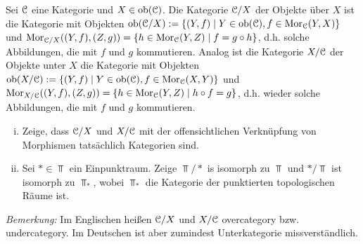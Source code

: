 \begin{aufgabe}
	Sei $\mathcal C$ eine Kategorie und $X\in\textrm{ob}(\mathcal C)$. Die Kategorie $\mathcal C/X$ der Objekte über $X$ ist die Kategorie mit Objekten $\textrm{ob}(\mathcal C/X):=\{(Y,f)\mid Y\in\textrm{ob}(\mathcal C),f\in\operatorname{Mor}_\mathcal C(Y,X)\}$ und $\operatorname{Mor}_{\mathcal C/X}((Y,f),(Z,g))=\{h\in\operatorname{Mor}_\mathcal C(Y,Z)\mid f=g\circ h\}$, d.h. solche Abbildungen, die mit $f$ und $g$ kommutieren.  Analog ist die Kategorie $X/\mathcal C$ der Objekte unter $X$ die Kategorie mit Objekten $\textrm{ob}(X/\mathcal C):=\{(Y,f)\mid Y\in\textrm{ob}(\mathcal C),f\in\operatorname{Mor}_\mathcal C(X,Y)\}$ und $\operatorname{Mor}_{X/\mathcal C}((Y,f),(Z,g))=\{h\in\operatorname{Mor}_\mathcal C(Y,Z)\mid h\circ f=g\}$, d.h. wieder solche Abbildungen, die mit $f$ und $g$ kommutieren. 
	\begin{enumerate}[(i)]
		\item Zeige, dass $\mathcal C/X$ und $X/\mathcal C$ mit der offensichtlichen Verknüpfung von Morphismen tatsächlich Kategorien sind.
		\item Sei $*\in\Top$ ein Einpunktraum. Zeige $\Top/*$ is isomorph zu $\Top$ und $*/\Top$ ist isomorph zu $\Top_*$, wobei $\Top_*$ die Kategorie der punktierten topologischen Räume ist.
	\end{enumerate}
\emph{Bemerkung:} Im Englischen heißen $\mathcal C/X$ und $X/\mathcal C$ overcategory bzw. undercategory. Im Deutschen ist aber zumindest Unterkategorie missverständlich.
\end{aufgabe}
